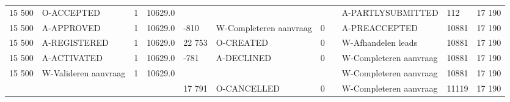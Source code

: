 \begin{tabular}{lllllllllll}
15 500 & O-ACCEPTED & 1 & 10629.0 &  &  &  &  & A-PARTLYSUBMITTED & 112 & 17 190 \\
15 500 & A-APPROVED & 1 & 10629.0 & -810 & W-Completeren aanvraag & 0 &  & A-PREACCEPTED & 10881 & 17 190 \\
15 500 & A-REGISTERED & 1 & 10629.0 & 22 753 & O-CREATED & 0 &  & W-Afhandelen leads & 10881 & 17 190 \\
15 500 & A-ACTIVATED & 1 & 10629.0 & -781 & A-DECLINED & 0 &  & W-Completeren aanvraag & 10881 & 17 190 \\
15 500 & W-Valideren aanvraag & 1 & 10629.0 &  &  &  &  & W-Completeren aanvraag & 10881 & 17 190 \\
 &  &  &  & 17 791 & O-CANCELLED & 0 &  & W-Completeren aanvraag & 11119 & 17 190 \\
\bottomrule
\end{tabular}
